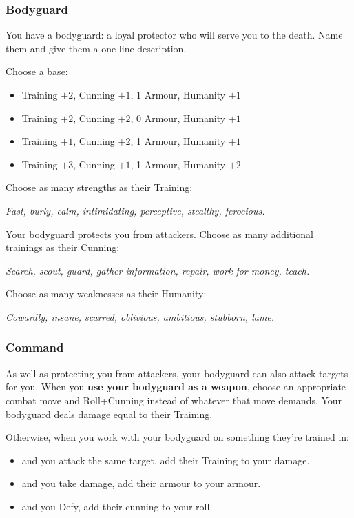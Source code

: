 \subsubsection{Bodyguard}
You have a bodyguard: a loyal protector who will serve you to the death. Name them and give them a one-line description.

Choose a base:
\begin{itemize}
\item Training $+2$, Cunning $+1$, 1 Armour, Humanity $+1$
\item Training $+2$, Cunning $+2$, 0 Armour, Humanity $+1$
\item Training $+1$, Cunning $+2$, 1 Armour, Humanity $+1$
\item Training $+3$, Cunning $+1$, 1 Armour, Humanity $+2$
\end{itemize}

Choose as many strengths as their Training:

\textit{Fast, burly, calm, intimidating, perceptive, stealthy, ferocious.}

Your bodyguard protects you from attackers. Choose as many additional trainings as their Cunning:

\textit{Search, scout, guard, gather information, repair, work for money, teach.}

Choose as many weaknesses as their Humanity:

\textit{Cowardly, insane, scarred, oblivious, ambitious, stubborn, lame.}

\subsubsection{Command}
As well as protecting you from attackers, your bodyguard can also attack targets for you. When you \textbf{use your bodyguard as a weapon}, choose an appropriate combat move and Roll+Cunning instead of whatever that move demands. Your bodyguard deals damage equal to their Training.

Otherwise, when you work with your bodyguard on something they're trained in:
\begin{itemize}
\item and you attack the same target, add their Training to your damage.
\item and you take damage, add their armour to your armour.
\item and you Defy, add their cunning to your roll.
\end{itemize}

